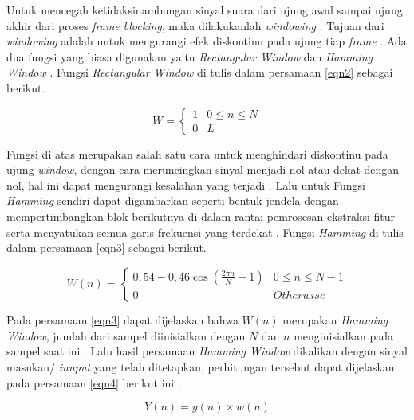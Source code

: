 \begin{enumerate}
\par Untuk mencegah ketidaksinambungan sinyal suara dari ujung awal sampai ujung akhir dari proses \textit{frame blocking}, maka dilakukanlah \textit{windowing} \citep{efendi2019}. Tujuan dari \textit{windowing} adalah untuk mengurangi efek diskontinu pada ujung tiap \textit{frame} \citep{heriyanto2018}. Ada dua fungsi yang biasa digunakan yaitu \textit{Rectangular Window} dan \textit{Hamming Window} \citep{laksono2018}. Fungsi \textit{Rectangular Window} di tulis dalam persamaan \ref{eqn2} sebagai berikut.

\begin{equation}
	W = 
	\begin{cases}
		1 & 0 \le n \le N\\
		0 & L
	\end{cases}
	\label{eqn2}
\end{equation}

\par Fungsi di atas merupakan salah satu cara untuk menghindari diskontinu pada ujung \textit{window}, dengan cara meruncingkan sinyal menjadi nol atau dekat dengan nol, hal ini dapat mengurangi kesalahan yang terjadi \citep{laksono2018}. Lalu untuk Fungsi \textit{Hamming} sendiri dapat digambarkan seperti bentuk jendela dengan mempertimbangkan blok berikutnya di dalam rantai pemrosesan ekstraksi fitur serta menyatukan semua garis frekuensi yang terdekat \citep{laksono2018}. Fungsi \textit{Hamming} di tulis dalam persamaan \ref{eqn3} sebagai berikut.

\begin{equation}
	W(n) = 
	\begin{cases}
		0,54 - 0,46 \cos (\frac{2 \pi n}{N} - 1) & 0 \le n \le N-1\\
		0 & Otherwise
	\end{cases}
	\label{eqn3}
\end{equation}

\par Pada persamaan \ref{eqn3} dapat dijelaskan bahwa $W(n)$ merupakan \textit{Hamming Window}, jumlah dari sampel diinisialkan dengan $N$ dan $n$ menginisialkan pada sampel saat ini \citep{dua2018}. Lalu hasil persamaan \textit{Hamming Window} dikalikan dengan sinyal masukan/ \textit{innput} yang telah ditetapkan, perhitungan tersebut dapat dijelaskan pada persamaan \ref{eqn4} berikut ini \citep{laksono2018}.

\begin{equation}
	Y(n) = y(n) \times w(n)
	\label{eqn4}
\end{equation}


\end{enumerate}
